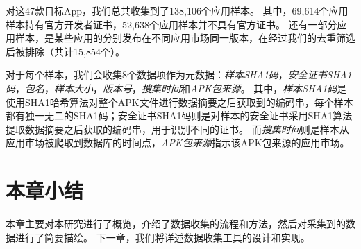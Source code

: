 对这47款目标App，我们总共收集到了138,106个应用样本。
其中，69,614个应用样本持有官方开发者证书，52,638个应用样本并不具有官方证书。
还有一部分应用样本，是某些应用的分别发布在不同应用市场同一版本，在经过我们的去重筛选后被排除（共计15,854个）。

对于每个样本，我们会收集8个数据项作为元数据：\emph{样本SHA1码}，\emph{安全证书SHA1码}，\emph{包名}，\emph{样本大小}，\emph{版本号}，\emph{搜集时间}和\emph{APK包来源}。
其中，\emph{样本SHA1码}是使用SHA1哈希算法对整个APK文件进行数据摘要之后获取到的编码串，每个样本都有独一无二的SHA1码；安全证书SHA1码则是对样本的安全证书采用SHA1算法提取数据摘要之后获取的编码串，用于识别不同的证书。
而\emph{搜集时间}则是样本从应用市场被爬取到数据库的时间点，\emph{APK包来源}指示该APK包来源的应用市场。

\section{本章小结}

本章主要对本研究进行了概览，介绍了数据收集的流程和方法，然后对采集到的数据进行了简要描绘。
下一章，我们将详述数据收集工具\mytool 的设计和实现。

